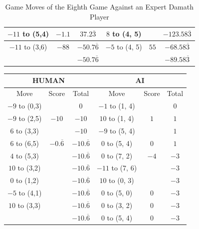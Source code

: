 \begin{appendices}
\begin{table}[H]
\begin{tabular}{cccccc}
          $-11$ to (5,4)  & $-1.1$                        &  $37.2\overline3$    &   $8$ to (4, 5) &                            &  $-123.58\overline3$    \\ \hline
          $-11$ to (3,6)  & $-88$                        &  $-50.7\overline6$    &   $-5$ to (4, 5) &            $55$ &  $-68.58\overline3$    \\ \hline \hline
                          &                              &  $-50.7\overline6$    &                  &           &  $-89.58\overline3$    \\ \hline \hline
    \end{tabular}
    \caption{Game Moves of the Eighth Game Against an Expert Damath Player}
    \label{tab:eighth-game}
\end{table}

\begin{table}[H]
    \centering
    \begin{tabular}{cccccc}
        \hline
        \multicolumn{3}{c}{HUMAN}        & \multicolumn{3}{c}{AI}     \\ \hline
        Move         & Score & Total & Move          & Score & Total \\ \hline
          $-9$ to (0,3) &                 &  0    &   $-1$ to (1, 4) &       &  0    \\ \hline
          $-9$ to (2,5) & $-10$           &  $-10$ &   $10$ to (1, 4) & $1$  &  $1$    \\ \hline
          $6$ to (3,3)  &                 &  $-10$ &   $-9$ to (5, 4) &      &  $1$    \\ \hline
          $6$ to (6,5)  & $-0.\overline6$ &  $-10.\overline6$ &   $0$ to (5, 4) & $0$      &  $1$    \\ \hline
          $4$ to (5,3)  &                 &  $-10.\overline6$ &   $0$ to (7, 2) & $-4$      &  $-3$    \\ \hline
          $10$ to (3,2)  &                &  $-10.\overline6$ &   $-11$ to (7, 6) &           &  $-3$    \\ \hline
          $0$ to (1,2)  &                &  $-10.\overline6$ &   $10$ to (0, 3) &           &  $-3$    \\ \hline
          $-5$ to (4,1)  &                &  $-10.\overline6$ &   $0$ to (5, 0) & $0$        &  $-3$    \\ \hline
          $10$ to (3,3)  &                &  $-10.\overline6$ &   $0$ to (3, 2) & $0$        &  $-3$    \\ \hline
                         &                &  $-10.\overline6$ &   $0$ to (5, 4) & $0$        &  $-3$    \\ \hline

\end{tabular}
\end{table}
\end{appendices}
